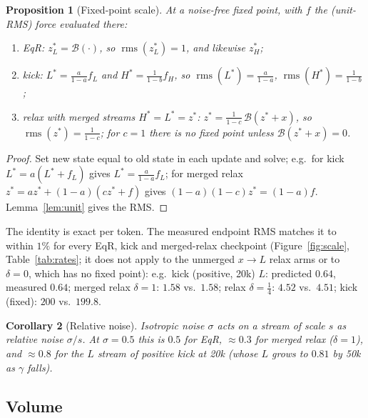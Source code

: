 \documentclass[11pt]{article}
\newtheorem{proposition}{Proposition}
\newtheorem{corollary}[proposition]{Corollary}
\theoremstyle{definition}
\newcommand{\rms}{\operatorname{rms}}
\newcommand{\zH}{z_H}
\newcommand{\zL}{z_L}
\newcommand{\Bk}{\mathcal{B}}
\begin{document}
\begin{proposition}[Fixed-point scale]\label{prop:scale}
At a noise-free fixed point, with $f$ the (unit-RMS) force evaluated there:
\begin{enumerate}[label=(\alph*),itemsep=0pt]
\item EqR: $\zL^\ast = \Bk(\cdot)$, so $\rms(\zL^\ast)=1$, and likewise $\zH^\ast$;
\item kick: $L^\ast=\tfrac{a}{1-a}f_L$ and $H^\ast=\tfrac{1}{1-b}f_H$, so $\rms(L^\ast)=\tfrac{a}{1-a}$, $\rms(H^\ast)=\tfrac{1}{1-b}$;
\item relax with merged streams $H^\ast=L^\ast=z^\ast$: $z^\ast=\tfrac{1}{1-c}\,\Bk(z^\ast+x)$, so $\rms(z^\ast)=\tfrac{1}{1-c}$; for $c=1$ there is no fixed point unless $\Bk(z^\ast+x)=0$.
\end{enumerate}
\end{proposition}
\begin{proof}Set new state equal to old state in each update and solve; e.g.\ for kick $L^\ast=a(L^\ast+f_L)$ gives $L^\ast=\frac{a}{1-a}f_L$; for merged relax
$z^\ast=az^\ast+(1-a)(cz^\ast+f)$ gives $(1-a)(1-c)z^\ast=(1-a)f$. Lemma~\ref{lem:unit} gives the RMS.\end{proof}

\noindent The identity is exact per token. The measured endpoint RMS matches it to within $1\%$ for every EqR, kick and merged-relax
checkpoint (Figure~\ref{fig:scale}, Table~\ref{tab:rates}; it does not apply to the unmerged $x\to L$ relax arms or to $\delta=0$, which has no fixed point): e.g.\ kick (positive, 20k) $L$: predicted $0.64$, measured $0.64$; merged relax $\delta=1$:
$1.58$ vs.\ $1.58$; relax $\delta=\frac14$: $4.52$ vs.\ $4.51$; kick (fixed): $200$ vs.\ $199.8$.

\begin{corollary}[Relative noise]
Isotropic noise $\sigma$ acts on a stream of scale $s$ as relative noise $\sigma/s$. At $\sigma=0.5$ this is $0.5$ for EqR, $\approx0.3$ for
merged relax ($\delta=1$), and $\approx0.8$ for the $L$ stream of positive kick at 20k (whose $L$ grows to $0.81$ by 50k as $\gamma$ falls).
\end{corollary}

\subsection{Volume}
\end{document}
